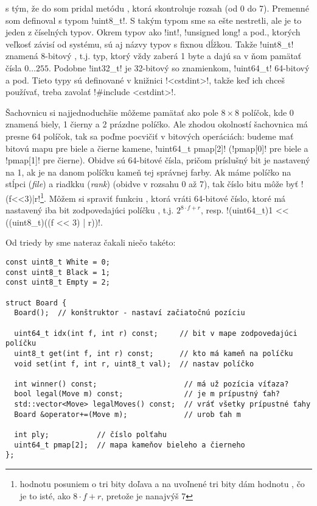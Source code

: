 s tým, že do  som pridal metódu , ktorá skontroluje rozsah (od 0 do 7). 
Premenné  som definoval s typom
\prg!uint8_t!. S takým typom sme sa ešte nestretli, ale je to jeden z číselných
typov. Okrem typov ako \prg!int!, \prg!unsigned long! a pod., ktorých veľkosť
závisí od systému, sú aj názvy typov s fixnou dĺžkou. Takže \prg!uint8_t!
znamená 8-bitový , t.j. typ, ktorý vždy zaberá 1 byte a dajú
sa v ňom pamätať čísla $0\ldots255$. Podobne \prg!int32_t! je 32-bitový
 so znamienkom, \prg!uint64_t! 64-bitový   a pod.
Tieto typy sú definované v knižnici \prg!<cstdint>!, takže keď ich chceš používať,
treba zavolať \prg!#include <cstdint>!.

Šachovnicu si najjednoduchšie môžeme pamätať ako pole $8\times 8$ políčok, kde 0 znamená biely,
1 čierny a 2 prázdne políčko. Ale zhodou okolností šachovnica má presne 64 políčok, tak sa poďme pocvičiť v bitových operáciách:
budeme mať bitovú mapu pre biele a čierne kamene, \prg!uint64_t pmap[2]! (\prg!pmap[0]! pre biele a \prg!pmap[1]! pre čierne). 
Obidve sú 64-bitové čísla, pričom príslušný bit je nastavený na 1, ak je na danom políčku kameň tej správnej farby.
Ak máme políčko na stĺpci ({\em file})  a riadkku ({\em rank})  (obidve v rozsahu 0 až 7), tak číslo bitu môže byť 
\prg!(f<<3)|r!\footnote{hodnotu  posuniem o tri bity doľava a na uvoľnené tri bity dám hodnotu , čo je to isté, ako
$8\cdot f+r$, pretože  je nanajvýš 7}.
Môžem si spraviť funkciu , ktorá vráti 64-bitové číslo, ktoré má nastavený iba bit zodpovedajúci políčku ,
t.j. $2^{8\cdot f + r}$, resp. \prg!(uint64_t)1 << ((uint8_t)((f << 3) | r))!.



Od triedy  by sme nateraz čakali niečo takéto:

\begin{lstlisting}
const uint8_t White = 0;
const uint8_t Black = 1;
const uint8_t Empty = 2;

struct Board {
  Board();  // konštruktor - nastaví začiatočnú pozíciu

  uint64_t idx(int f, int r) const;     // bit v mape zodpovedajúci políčku
  uint8_t get(int f, int r) const;      // kto má kameň na políčku
  void set(int f, int r, uint8_t val);  // nastav políčko

  int winner() const;                    // má už pozícia víťaza?
  bool legal(Move m) const;              // je m prípustný ťah?
  std::vector<Move> legalMoves() const;  // vráť všetky prípustné ťahy
  Board &operator+=(Move m);             // urob ťah m

  int ply;           // číslo polťahu
  uint64_t pmap[2];  // mapa kameňov bieleho a čierneho
};
\end{lstlisting}


